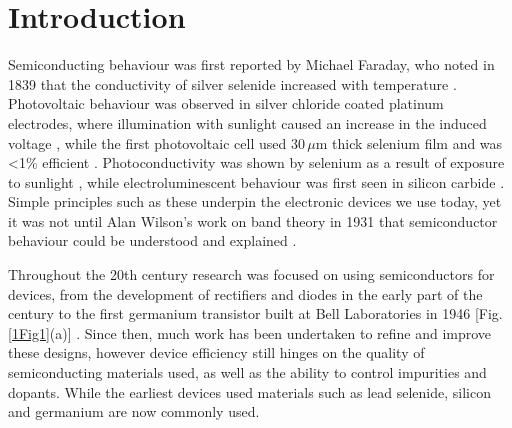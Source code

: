 
\chapter{Introduction}

\graphicspath{{Chapter1/Figures/}}

Semiconducting behaviour was first reported by Michael Faraday, who noted in 1839 that the conductivity of silver selenide increased with temperature \cite{Faraday2012}. Photovoltaic behaviour was observed in silver chloride coated platinum electrodes, where illumination with sunlight caused an increase in the induced voltage \cite{Becquerel1839}, while the first photovoltaic cell used 30\,$\mu$m thick selenium film and was <1\% efficient \cite{Fritts1883}. Photoconductivity was shown by selenium as a result of exposure to sunlight \cite{Smith1873, Adams1876}, while electroluminescent behaviour was first seen in silicon carbide \cite{Round1907}. Simple principles such as these underpin the electronic devices we use today, yet it was not until Alan Wilson's work on band theory in 1931 that semiconductor behaviour could be understood and explained \cite{Wilson1931}. 

Throughout the 20th century research was focused on using semiconductors for devices, from the development of rectifiers and diodes in the early part of the century \cite{Jenkins2005} to the first germanium transistor built at Bell Laboratories in 1946 [Fig.\,\ref{1Fig1}(a)] \cite{TransistorHist}. Since then, much work has been undertaken to refine and improve these designs, however device efficiency still hinges on the quality of semiconducting materials used, as well as the ability to control impurities and dopants. While the earliest devices used materials such as lead selenide, silicon and germanium are now commonly used.

